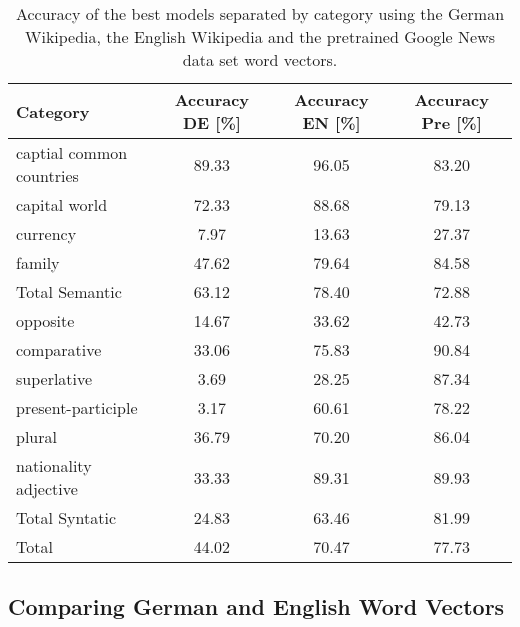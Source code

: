 \begin{table}[h]
\centering
\small
\caption{Accuracy of the best models separated by category using the German
  Wikipedia, the English Wikipedia and the pretrained Google News data set
  word vectors. } 
\label{tab:language_comparisson}


\small
\begin{tabular}{|l|c|c|c|}
\hline
 Category                  &  Accuracy DE [\%]  &  Accuracy EN [\%]  &  Accuracy Pre [\%]  \\
\hline
 captial common countries  &             89.33  &             96.05  &              83.20  \\
 capital world             &             72.33  &             88.68  &              79.13  \\
 currency                  &              7.97  &             13.63  &              27.37  \\
 family                    &             47.62  &             79.64  &              84.58  \\
\hline
 Total Semantic            &             63.12  &             78.40  &              72.88  \\
\hline
 opposite                  &             14.67  &             33.62  &              42.73  \\
 comparative               &             33.06  &             75.83  &              90.84  \\
 superlative               &              3.69  &             28.25  &              87.34  \\
 present-participle        &              3.17  &             60.61  &              78.22  \\
 plural                    &             36.79  &             70.20  &              86.04  \\
 nationality adjective     &             33.33  &             89.31  &              89.93  \\
\hline
 Total Syntatic            &             24.83  &             63.46  &              81.99  \\
\hline
 Total                     &             44.02  &             70.47  &              77.73  \\
\hline
\end{tabular}

\end{table}





\subsection{Comparing German and English Word Vectors}
\label{sec:sub:comparing_english_german_w2v}

